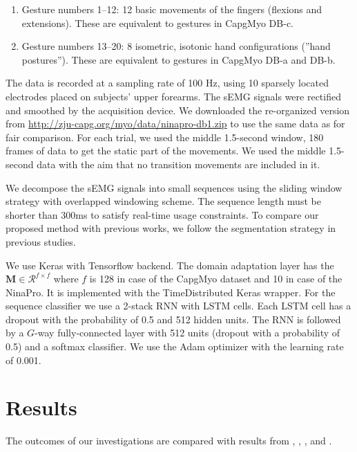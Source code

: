 \documentclass[conference]{IEEEtran}
\begin{document}
\begin{enumerate}
\begin{enumerate}
		\begin{enumerate}
		\item Gesture numbers 1–12: 12 basic movements of the fingers (flexions and extensions). These are
		equivalent to gestures in CapgMyo DB-c.
		\item Gesture numbers 13–20: 8 isometric, isotonic hand configurations (”hand postures”). These are
		equivalent to gestures in CapgMyo DB-a and DB-b.
	  \end{enumerate}
  \end{enumerate}
  The data is recorded at a sampling rate of 100 Hz, using 10 sparsely located electrodes placed on subjects’ upper forearms.
  The sEMG signals were rectified and smoothed by the acquisition device.
  We downloaded the re-organized version from \url{http://zju-capg.org/myo/data/ninapro-db1.zip} to use the same data as \cite{b18} for fair comparison.
  For each trial, we used the middle 1.5-second window, 180 frames of data to get the static part of the movements.
  We used the middle 1.5-second data with the aim that no transition movements are included in it.
\end{enumerate}

We decompose the sEMG signals into small sequences using the sliding window strategy with overlapped windowing scheme.
The sequence length must be shorter than 300ms \cite{b19} to satisfy real-time usage constraints. To compare our proposed method with previous works, we follow
the segmentation strategy in previous studies.

We use Keras with Tensorflow backend. The domain adaptation layer has the $\mathbf{M} \in \mathcal{R}^{f \times f}$ where $f$ is 128 in case of the CapgMyo dataset and 10 in case of the NinaPro.
It is implemented with the TimeDistributed Keras wrapper.
For the sequence classifier we use a 2-stack RNN with LSTM cells. Each LSTM cell has a dropout with the probability of 0.5 and 512
hidden units. The RNN is followed by a $G$-way fully-connected layer with 512 units (dropout with a probability of 0.5) and a softmax classifier.
We use the Adam optimizer \cite{adam} with the learning rate of 0.001.

\section{Results} \label{sec:results}

The outcomes of our investigations are compared with results from \cite{b23}, \cite{b18}, \cite{b7}, and \cite{b19}.
\end{document}
